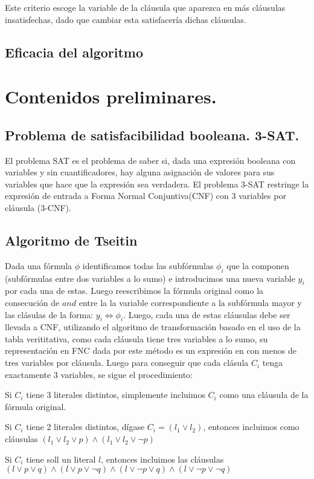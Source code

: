 \documentclass[article]{llncs}
\begin{document}
Este criterio escoge la variable de la cláusula que aparezca en más cláusulas insatisfechas, dado que cambiar esta satisfacería
dichas cláusulas.

\subsection{Eficacia del algoritmo}

\section{Contenidos preliminares.}

\subsection{Problema de satisfacibilidad booleana. 3-SAT.}

El problema SAT es el problema de saber si, dada una expresión booleana con variables y sin cuantificadores, 
hay alguna asignación de valores para sus variables que hace que la expresión sea verdadera. El problema 3-SAT restringe 
la expresión de entrada a Forma Normal Conjuntiva(CNF) con 3 variables por cláusula (3-CNF).

\subsection{Algoritmo de Tseitin}

Dada una fórmula $\phi $ identificamos todas las subfórmulas $\phi_i$ que la componen (subfórmulas entre dos variables a lo sumo) e introducimos una nueva variable 
$y_i$ por cada una de estas. Luego reescribimos la fórmula original como la consecución de $and$ entre la la variable correspondiente
a la subfórmula mayor y las clásulas de la forma: $ y_i \Leftrightarrow \phi_i$. Luego, cada una de estas cláusulas debe ser llevada
a CNF, utilizando el algoritmo de transformación basado en el uso de la tabla verititativa, como cada cláusula tiene tres variables a lo sumo, su representación
en FNC dada por este método es un expresión en con menos de tres variables por cláusula. Luego para conseguir que cada clásula $C_i$ tenga exactamente
3 variables, se sigue el procedimiento:

\bullet Si $C_i$ tiene 3 literales distintos, simplemente incluimos $C_i$ como una cláusula de la fórmula original.

\bullet Si $C_i$ tiene 2 literales distintos, dígase $C_i = (l_1 \vee  l_2)$, entonces incluimos como cláusulas
$(l_1\vee l_2\vee p)\wedge (l_1\vee l_2\vee \lnot p)$

\bullet Si $C_i$ tiene soll un literal $l$, entonces incluimos las cláusulas 
$(l\vee p\vee q)\wedge (l\vee p\vee \lnot q) \wedge (l\vee \lnot p \vee q)\wedge (l\vee \lnot p\vee \lnot q)$
\end{document}
